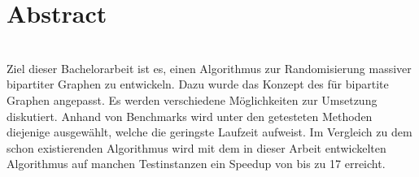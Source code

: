 \chapter*{Abstract}


~\\

Ziel dieser Bachelorarbeit ist es, einen  Algorithmus
zur Randomisierung massiver bipartiter Graphen zu entwickeln. Dazu 
wurde das Konzept des \gc{} für bipartite Graphen
angepasst. Es werden verschiedene Möglichkeiten zur Umsetzung diskutiert.
Anhand von Benchmarks wird unter den getesteten Methoden diejenige ausgewählt,
welche die geringste Laufzeit aufweist.
Im Vergleich zu dem schon existierenden \gc{} Algorithmus 
wird mit dem in dieser Arbeit entwickelten Algorithmus 
auf manchen Testinstanzen ein Speedup von bis zu 17 erreicht.



